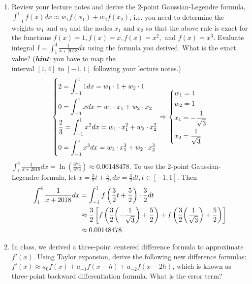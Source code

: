 \documentclass[10pt]{report}
\newcommand{\dintt}[4] {\int_{#1}^{#2} #3 d#4}
\DeclarePairedDelimiter\autoparen{(}{)}
\newcommand{\pa}[1]{\autoparen*{#1}}
\begin{document}
\begin{enumerate}
	\item 
	Review your lecture notes and derive the 2-point Gaussian-Legendre formula, $\dintt{-1}{1}{f(x)}{x} \approx w_1 f(x_1) + w_2 f(x_2)$, i.e. you need to determine the weights $w_1$ and $w_2$ and the nodes $x_1$ and $x_2$ so that the above rule is exact for the functions $f(x)=1, f(x)=x, f(x)=x^2,$ and $f(x)=x^3$. Evaluate integral $I = \dintt{1}{4}{\frac{1}{x+2018}}{x}$ using the formula you derived. What is the exact value? (\textit{\textbf{hint}}: you have to map the\\[0.5 ex]
	interval $[1, 4]$ to $[-1,1]$ following your lecture notes.)
	\[
	\begin{dcases}
	2 = \dintt{-1}{1}{1}{x} = w_1\cdot 1 + w_2\cdot 1\\
	0 = \dintt{-1}{1}{x}{x} = w_1\cdot x_1 + w_2\cdot x_2\\
	\frac{2}{3} = \dintt{-1}{1}{x^2}{x} = w_1\cdot x_1^2 + w_2\cdot x_2^2\\
	0 = \dintt{-1}{1}{x^3}{x} = w_1\cdot x_1^3 + w_2\cdot x_2^3
	\end{dcases}
	\Rightarrow
	\begin{dcases}
	w_1 = 1\\
	w_2 = 1\\
	x_1 = -\frac{1}{\sqrt{3}}\\
	x_2 = \frac{1}{\sqrt{3}}\\
	\end{dcases}
	\]
	$\dintt{1}{4}{\frac{1}{x+2018}}{x} = \ln(\frac{674}{673}) \approx 0.00148478$. To use the 2-point Gaussian-Legendre formula, let $x = \frac{3}{2}t+\frac{5}{2}, dx = \frac{3}{2}dt, t\in [-1, 1]$. Then 
	\begin{align*}
	\dintt{1}{4}{\frac{1}{x+2018}}{x} 
	&= \dintt{-1}{1}{f\left(\frac{3}{2}t+\frac{5}{2}\right)\cdot\frac{3}{2}}{t} \\
	&\approx \frac{3}{2} \left[
	f\left(\frac{3}{2} \pa{-\frac{1}{\sqrt{3}}} + \frac{5}{2}\right) 
	+ f\left(\frac{3}{2} \pa{\frac{1}{\sqrt{3}}} + \frac{5}{2}\right) 
	\right]\\
	&\approx 0.00148478
	\end{align*}
	
	\item 
	In class, we derived a three-point centered difference formula to approximate $f'(x)$. Using Taylor expansion, derive the following new difference formulas: $f'(x)\approx a_0 f(x) + a_{-1}f(x-h) + a_{-2}f(x-2h)$, which is known as three-point backward differentiation formula. What is the error term?
	

\end{enumerate}
\end{document}
